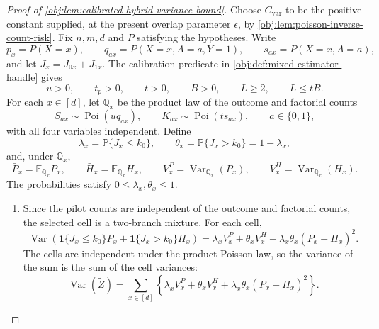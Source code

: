 \begin{proof}[Proof of \cref{obj:lem:calibrated-hybrid-variance-bound}]
Choose \(C_{\mathrm{var}}\) to be the positive constant supplied, at the present overlap parameter \(\epsilon\), by \cref{obj:lem:poisson-inverse-count-risk}. Fix \(n,m,d\) and \(P\) satisfying the hypotheses. Write
\[
p_x=P(X=x),\qquad
q_{ax}=P(X=x,A=a,Y=1),\qquad
s_{ax}=P(X=x,A=a),
\]
and let \(J_x=J_{0x}+J_{1x}\). The calibration predicate in \cref{obj:def:mixed-estimator-handle} gives
\[
u>0,\qquad t_p>0,\qquad t>0,\qquad B>0,\qquad L\ge2,\qquad L\le tB .
\]
For each \(x\in[d]\), let \(\mathbb Q_x\) be the product law of the outcome and factorial counts
\[
S_{ax}\sim\operatorname{Poi}(u q_{ax}),\qquad
K_{ax}\sim\operatorname{Poi}(t s_{ax}),\qquad a\in\{0,1\},
\]
with all four variables independent. Define
\[
\lambda_x=\mathbb P\{J_x\le k_0\},\qquad
\theta_x=\mathbb P\{J_x>k_0\}=1-\lambda_x,
\]
and, under \(\mathbb Q_x\),
\[
\bar P_x=\mathbb E_{\mathbb Q_x}P_x,\qquad
\bar H_x=\mathbb E_{\mathbb Q_x}H_x,\qquad
V^P_x=\operatorname{Var}_{\mathbb Q_x}(P_x),\qquad
V^H_x=\operatorname{Var}_{\mathbb Q_x}(H_x).
\]
The probabilities satisfy \(0\le\lambda_x,\theta_x\le1\). %

\begin{enumerate}
\item Since the pilot counts are independent of the outcome and factorial counts, the selected cell is a two-branch mixture. For each cell,
\[
\operatorname{Var}\!\left(
\mathbf 1\{J_x\le k_0\}P_x+\mathbf 1\{J_x>k_0\}H_x
\right)
=
\lambda_x V^P_x+\theta_x V^H_x
+\lambda_x\theta_x(\bar P_x-\bar H_x)^2 .
\]
The cells are independent under the product Poisson law, so the variance of the sum is the sum of the cell variances:
\[
\operatorname{Var}(\widetilde Z)
=
\sum_{x\in[d]}
\left\{
\lambda_x V^P_x+\theta_x V^H_x
+\lambda_x\theta_x(\bar P_x-\bar H_x)^2
\right\}.
\]


\end{enumerate}
\end{proof}
